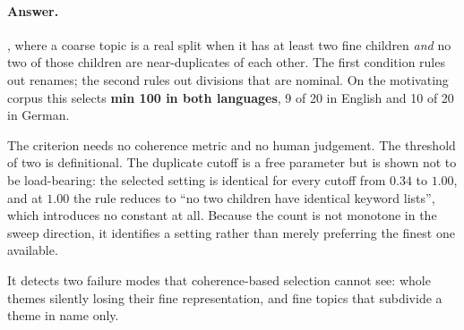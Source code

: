 \paragraph{Answer.}
, where a coarse topic is a real split when it has at least two fine children \emph{and} no
two of those children are near-duplicates of each other. The first condition rules out renames;
the second rules out divisions that are nominal. \measured{} On the motivating corpus this selects
\textbf{min 100 in both languages}, 9 of 20 in English and 10 of 20 in German.

The criterion needs no coherence metric and no human judgement. The threshold of two is
definitional. The duplicate cutoff is a free parameter but is shown not to be load-bearing: the
selected setting is identical for every cutoff from $0.34$ to $1.00$, and at $1.00$ the rule reduces to ``no two children have identical
keyword lists'', which introduces no constant at all. Because the count is not monotone in the
sweep direction, it identifies a setting rather than merely preferring the finest one available.

It detects two failure modes that coherence-based selection cannot see: whole themes silently
losing their fine representation, and fine topics that subdivide a theme in name only.

